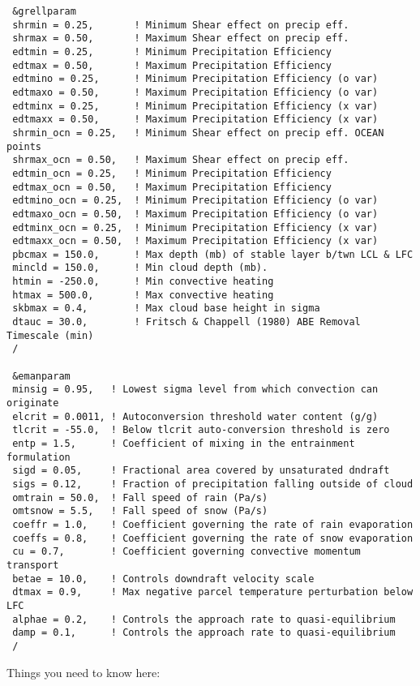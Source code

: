 {\footnotesize
\begin{Verbatim}
 &grellparam
 shrmin = 0.25,       ! Minimum Shear effect on precip eff.
 shrmax = 0.50,       ! Maximum Shear effect on precip eff.
 edtmin = 0.25,       ! Minimum Precipitation Efficiency
 edtmax = 0.50,       ! Maximum Precipitation Efficiency
 edtmino = 0.25,      ! Minimum Precipitation Efficiency (o var)
 edtmaxo = 0.50,      ! Maximum Precipitation Efficiency (o var)
 edtminx = 0.25,      ! Minimum Precipitation Efficiency (x var)
 edtmaxx = 0.50,      ! Maximum Precipitation Efficiency (x var)
 shrmin_ocn = 0.25,   ! Minimum Shear effect on precip eff. OCEAN points
 shrmax_ocn = 0.50,   ! Maximum Shear effect on precip eff.
 edtmin_ocn = 0.25,   ! Minimum Precipitation Efficiency
 edtmax_ocn = 0.50,   ! Maximum Precipitation Efficiency
 edtmino_ocn = 0.25,  ! Minimum Precipitation Efficiency (o var)
 edtmaxo_ocn = 0.50,  ! Maximum Precipitation Efficiency (o var)
 edtminx_ocn = 0.25,  ! Minimum Precipitation Efficiency (x var)
 edtmaxx_ocn = 0.50,  ! Maximum Precipitation Efficiency (x var)
 pbcmax = 150.0,      ! Max depth (mb) of stable layer b/twn LCL & LFC
 mincld = 150.0,      ! Min cloud depth (mb).
 htmin = -250.0,      ! Min convective heating
 htmax = 500.0,       ! Max convective heating
 skbmax = 0.4,        ! Max cloud base height in sigma
 dtauc = 30.0,        ! Fritsch & Chappell (1980) ABE Removal Timescale (min)
 /

 &emanparam
 minsig = 0.95,   ! Lowest sigma level from which convection can originate
 elcrit = 0.0011, ! Autoconversion threshold water content (g/g)
 tlcrit = -55.0,  ! Below tlcrit auto-conversion threshold is zero
 entp = 1.5,      ! Coefficient of mixing in the entrainment formulation
 sigd = 0.05,     ! Fractional area covered by unsaturated dndraft
 sigs = 0.12,     ! Fraction of precipitation falling outside of cloud
 omtrain = 50.0,  ! Fall speed of rain (Pa/s)
 omtsnow = 5.5,   ! Fall speed of snow (Pa/s)
 coeffr = 1.0,    ! Coefficient governing the rate of rain evaporation
 coeffs = 0.8,    ! Coefficient governing the rate of snow evaporation
 cu = 0.7,        ! Coefficient governing convective momentum transport
 betae = 10.0,    ! Controls downdraft velocity scale
 dtmax = 0.9,     ! Max negative parcel temperature perturbation below LFC
 alphae = 0.2,    ! Controls the approach rate to quasi-equilibrium
 damp = 0.1,      ! Controls the approach rate to quasi-equilibrium
 /
\end{Verbatim}
}

Things you need to know here:

